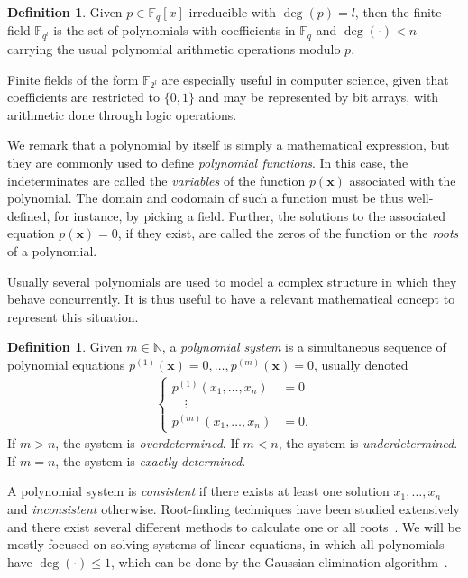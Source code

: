 \documentclass[draft, 12pt, a4paper, oneside]{memoir}
\theoremstyle{definition}
\newtheorem{definition}[theorem]{Definition}
\begin{document}
\begin{definition}
  Given $p \in \mathbb{F}_{q}[x]$ irreducible with $\deg(p) = l$, then the finite field $\mathbb{F}_{q^{l}}$ is the set of polynomials with coefficients in $\mathbb{F}_{q}$ and $\deg(\cdot) < n$ carrying the usual polynomial arithmetic operations modulo $p$.
\end{definition}

Finite fields of the form $\mathbb{F}_{2^{l}}$ are especially useful in computer science, given that coefficients are restricted to $\{0, 1\}$ and may be represented by bit arrays, with arithmetic done through logic operations.

We remark that a polynomial by itself is simply a mathematical expression, but they are commonly used to define \emph{polynomial functions}. In this case, the indeterminates are called the \emph{variables} of the function $p(\mathbf{x})$ associated with the polynomial. The domain and codomain of such a function must be thus well-defined, for instance, by picking a field. Further, the solutions to the associated equation $p(\mathbf{x}) = 0$, if they exist, are called the zeros of the function or the \emph{roots} of a polynomial. 

Usually several polynomials are used to model a complex structure in which they behave concurrently. It is thus useful to have a relevant mathematical concept to represent this situation.

\begin{definition}\label{def:polsys}
  Given $m \in \mathbb{N}$, a \emph{polynomial system} is a simultaneous sequence of polynomial equations $p^{(1)}(\mathbf{x}) = 0, \dots, p^{(m)}(\mathbf{x}) = 0$, usually denoted
  \begin{align*}
    \begin{cases}
      p^{(1)}(x_{1}, \dots, x_{n}) &= 0 \\
      \quad \vdots \\
      p^{(m)}(x_{1}, \dots, x_{n}) &= 0.
    \end{cases}
  \end{align*}
  If $m > n$, the system is \emph{overdetermined}. If $m < n$, the system is \emph{underdetermined}. If $m = n$, the system is \emph{exactly determined}.
\end{definition}

A polynomial system is \emph{consistent} if there exists at least one solution $x_{1}, \dots, x_{n}$ and \emph{inconsistent} otherwise. Root-finding techniques have been studied extensively and there exist several different methods to calculate one or all roots~\cite[Chapter 9]{Press:2007}. We will be mostly focused on solving systems of linear equations, in which all polynomials have $\deg(\cdot) \leq 1$, which can be done by the Gaussian elimination algorithm~\cite[Section 2.2]{Press:2007}.
\end{document}
